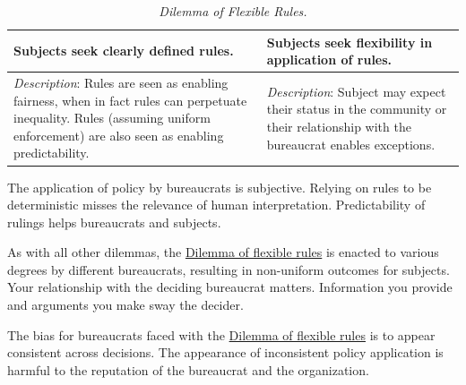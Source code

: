 \begin{center}
\begin{table}[H] %
\begin{tabular}{ | m{\dilemmatablewidth}| m{\dilemmatablewidth} | } 
  \hline
  \textbf{Subjects seek clearly defined rules.} &
  \textbf{Subjects seek flexibility in application of rules.} \\
  \hline
  \textit{Description}: Rules are seen as enabling fairness, when in fact rules can perpetuate inequality. Rules (assuming uniform enforcement) are also seen as enabling predictability. & 
  \textit{Description}: Subject may expect their status in the community or their relationship with the bureaucrat enables exceptions. \\
  \hline
\end{tabular}
\caption{\textit{Dilemma of Flexible Rules.}
}
\label{table:dilemma-subject-flexibility}
\end{table}
\end{center}

The application of policy by bureaucrats is subjective. Relying on rules to be deterministic misses the relevance of human interpretation. Predictability of rulings helps bureaucrats and subjects.

As with all other dilemmas, the \hyperref[table:dilemma-subject-flexibility]{Dilemma of flexible rules} is enacted to various degrees by different bureaucrats, resulting in non-uniform outcomes for subjects. Your relationship with the deciding bureaucrat matters. Information you provide and arguments you make sway the decider. 

The bias for bureaucrats faced with the \hyperref[table:dilemma-subject-flexibility]{Dilemma of flexible rules} is to appear consistent across decisions. The appearance of inconsistent policy application is harmful to the reputation of the bureaucrat and the organization.

